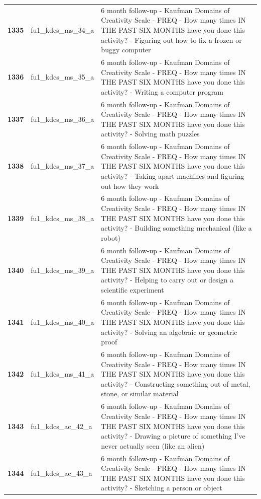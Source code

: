 \documentclass[
  letterpaper,
  DIV=11,
  numbers=noendperiod]{scrartcl}
\begin{document}
\begin{longtable}[t]{>{}cll}
\textbf{1335} & fu1\_kdcs\_ms\_34\_a & 6 month follow-up - Kaufman Domains of Creativity Scale - FREQ - How many times IN THE PAST SIX MONTHS have you done this activity? - Figuring out how to fix a frozen or buggy computer\\
\addlinespace
\textbf{1336} & fu1\_kdcs\_ms\_35\_a & 6 month follow-up - Kaufman Domains of Creativity Scale - FREQ - How many times IN THE PAST SIX MONTHS have you done this activity? - Writing a computer program\\
\textbf{1337} & fu1\_kdcs\_ms\_36\_a & 6 month follow-up - Kaufman Domains of Creativity Scale - FREQ - How many times IN THE PAST SIX MONTHS have you done this activity? - Solving math puzzles\\
\textbf{1338} & fu1\_kdcs\_ms\_37\_a & 6 month follow-up - Kaufman Domains of Creativity Scale - FREQ - How many times IN THE PAST SIX MONTHS have you done this activity? - Taking apart machines and figuring out how they work\\
\textbf{1339} & fu1\_kdcs\_ms\_38\_a & 6 month follow-up - Kaufman Domains of Creativity Scale - FREQ - How many times IN THE PAST SIX MONTHS have you done this activity? - Building something mechanical (like a robot)\\
\textbf{1340} & fu1\_kdcs\_ms\_39\_a & 6 month follow-up - Kaufman Domains of Creativity Scale - FREQ - How many times IN THE PAST SIX MONTHS have you done this activity? - Helping to carry out or design a scientific experiment\\
\addlinespace
\textbf{1341} & fu1\_kdcs\_ms\_40\_a & 6 month follow-up - Kaufman Domains of Creativity Scale - FREQ - How many times IN THE PAST SIX MONTHS have you done this activity? - Solving an algebraic or geometric proof\\
\textbf{1342} & fu1\_kdcs\_ms\_41\_a & 6 month follow-up - Kaufman Domains of Creativity Scale - FREQ - How many times IN THE PAST SIX MONTHS have you done this activity? - Constructing something out of metal, stone, or similar material\\
\textbf{1343} & fu1\_kdcs\_ac\_42\_a & 6 month follow-up - Kaufman Domains of Creativity Scale - FREQ - How many times IN THE PAST SIX MONTHS have you done this activity? - Drawing a picture of something I've never actually seen (like an alien)\\
\textbf{1344} & fu1\_kdcs\_ac\_43\_a & 6 month follow-up - Kaufman Domains of Creativity Scale - FREQ - How many times IN THE PAST SIX MONTHS have you done this activity? - Sketching a person or object\\

\end{longtable}
\end{document}
